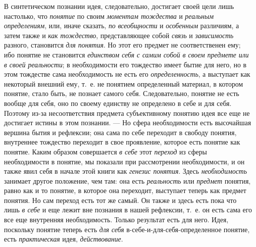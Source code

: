 \documentclass[twoside]{article}
\begin{document}
В синтетическом познании идея, следовательно, достигает своей
цели лишь настолько, что {\em понятие}
по своим {\em моментам
тождества} и
{\em реальным определениям},
или, иначе сказать,
{\em по всеобщности} и
{\em особенным}
различиям, а затем также и
{\em как тождество},
представляющее собой
{\em связь} и
{\em зависимость}
разного, становится
{\em для понятия}. Но
этот его предмет не соответственен ему; ибо понятие не становится
{\em единством себя с самим собой в
своем предмете или в своей реальности}; в необходимости его
тождество имеет бытие для него, но в этом тождестве сама необходимость не
есть его {\em определенность},
а выступает как некоторый внешний ему, т.~е. не понятием
определенный материал, в котором понятие, стало быть, не познает самого
себя. Следовательно, понятие не есть вообще для себя, оно по своему
единству не определено в себе и для себя. Поэтому из-за несоответствия
предмета субъективному понятию идея все еще не достигает
истины в этом познании. — Но сфера необходимости есть
высочайшая вершина бытия и рефлексии; она сама по себе переходит в свободу
понятия, внутреннее тождество переходит в свое проявление, которое есть
понятие как понятие. Каким образом совершается
{\em в себе} этот
{\em переход} из сферы
необходимости в понятие, мы показали при рассмотрении необходимости, и он
также явил себя в начале этой книги как
{\em генезис понятия}.
Здесь {\em необходимость}
занимает другое положение, чем там: она есть
{\em реальность} или
{\em предмет} понятия,
равно как и то понятие, в которое она переходит, выступает теперь как
предмет понятия. Но сам переход есть тот же самый. Он также и здесь есть
пока что лишь {\em в себе}
и еще лежит вне познания в нашей рефлексии, т.~е. он есть
сама его все еще внутренняя необходимость. Только результат есть для него.
Идея, поскольку понятие теперь есть
{\em для себя}
в-себе-и-для-себя-определенное понятие, есть
{\em практическая} идея,
{\em действование}.
\end{document}
